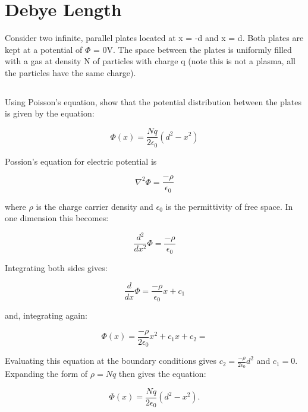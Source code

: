 \documentclass{template}
\begin{document}
\section{Debye Length}

Consider two infinite, parallel plates located at x = -d and x = d. Both plates are kept at a potential of $\Phi$ = 0V. The space between the plates is uniformly filled with a gas at density N of particles with charge q (note this is not a plasma, all the particles have the same charge).

\subsection{}

Using Poisson's equation, show that the potential distribution between the plates is given by the equation:

\[
    \Phi(x) = \frac{Nq}{2\epsilon_0}(d^2 - x^2)
\]

Possion's equation for electric potential is

\begin{equation}
    \nabla^2 \Phi = \frac{-\rho}{\epsilon_0}
\end{equation}

where $\rho$ is the charge carrier density and $\epsilon_0$ is the permittivity of free space. In one dimension this becomes:

\begin{equation}
    \frac{d^2}{dx^2}\Phi = \frac{-\rho}{\epsilon_0}
\end{equation}

Integrating both sides gives:

\begin{equation}
    \frac{d}{dx}\Phi = \frac{-\rho}{\epsilon_0}x + c_1
\end{equation}

and, integrating again:

\begin{equation}
    \Phi(x) = \frac{-\rho}{2\epsilon_0}x^2 + c_1x + c_2 = 
\end{equation}

Evaluating this equation at the boundary conditions gives $c_2 = \frac{-\rho}{2\epsilon_0}d^2$ and $c_1 =0$. Expanding the form of $\rho = Nq$ then gives the equation:

\begin{equation}
    \Phi(x) = \frac{Nq}{2\epsilon_0}(d^2 - x^2).
\end{equation}
\end{document}
